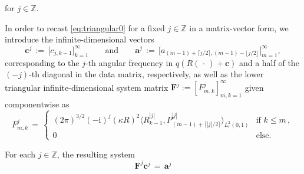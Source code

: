 \documentclass[11pt,a4paper]{article}
\theoremstyle{definition}
\theoremstyle{remark} \newtheorem{remark}[theorem]{Remark}
\numberwithin{equation}{section}
\numberwithin{figure}{section}
\numberwithin{algorithm}{section}
\numberwithin{table}{section}
\newcommand{\field}[1]{{\mathbb{#1}}}
\newcommand{\N}{\field{N}}
\newcommand{\Z}{\field{Z}}
\newcommand{\bs}{\boldsymbol}
\newcommand{\bfa}{{\bs a}}
\newcommand{\bfc}{{\bs c}}
\newcommand{\bfF}{{\bs F}}
\newcommand{\rmi}{\mathrm{i}}
\newcommand{\ph}{\,\cdot\,}
\begin{document}
for $j \in \Z$. %

In order to recast \eqref{eq:triangular0} for a fixed $j\in\Z$ in a matrix-vector form, we introduce the infinite-dimensional vectors 
\begin{equation}
\label{eq:full_vectors}
	\bfc^j \,:=\, \big[c_{j,k-1} \big]_{k=1}^{\infty}
	\qquad\text{and}\qquad
	\bfa^j \,:=\, \big[ a_{(m-1)+\lceil j/2\rceil,(m-1)-\lfloor j/2\rfloor} \big]_{m=1}^{\infty},
\end{equation}
corresponding to the $j$-th angular frequency in $q(R(\ph)+\bfc)$ and a half of the $(-j)$-th diagonal in the data matrix, respectively, as well as the lower triangular infinite-dimensional system matrix $\bfF^j:=[F^j_{m,k}]_{m,k=1}^\infty$ given componentwise as
\begin{equation}
\label{eq:F_comp}
	F^{j}_{m,k} \,=\, \begin{cases}
	(2\pi)^{3/2}(-\rmi)^j(\kappa R)^2 \big \langle R_{k-1}^{|j|}, P_{(m-1)+\lceil |j|/2\rceil}^{|j|} \big\rangle_{L^2_r(0,1)} & \text{if }  k\leq m
    \,,\\[1mm]
	0 & \text{else}.
	\end{cases}
\end{equation}

For each $j\in\Z$, the resulting system
\begin{equation}
\label{eq:infinite_system}
	\bfF^{j} \bfc^j\,=\, \bfa^j
\end{equation}
\end{document}

